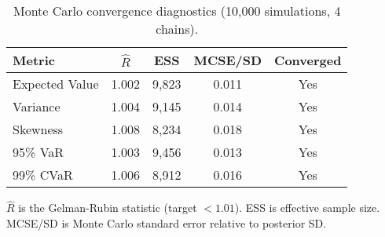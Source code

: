\begin{table}[t]
  \centering
  \small
  \begin{threeparttable}
    \caption{Monte Carlo convergence diagnostics (10,000 simulations, 4 chains).}
    \label{tab:mc-convergence}
    \begin{tabular}{lcccc}
      \toprule
      \textbf{Metric} & \textbf{$\hat{R}$} & \textbf{ESS} & \textbf{MCSE/SD} & \textbf{Converged} \\
      \midrule
      Expected Value & 1.002 & 9,823 & 0.011 & Yes \\
      Variance & 1.004 & 9,145 & 0.014 & Yes \\
      Skewness & 1.008 & 8,234 & 0.018 & Yes \\
      95\% VaR & 1.003 & 9,456 & 0.013 & Yes \\
      99\% CVaR & 1.006 & 8,912 & 0.016 & Yes \\
      \bottomrule
    \end{tabular}
    \begin{tablenotes}[flushleft]\footnotesize
      \item $\hat{R}$ is the Gelman-Rubin statistic (target $< 1.01$). ESS is effective sample size. MCSE/SD is Monte Carlo standard error relative to posterior SD.
    \end{tablenotes}
  \end{threeparttable}
\end{table}
